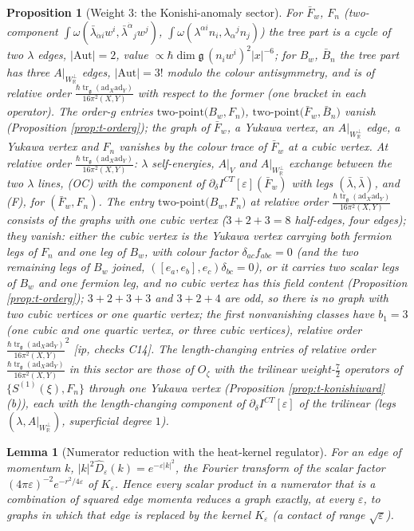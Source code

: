 \documentclass[11pt]{report}
\theoremstyle{plain}
\newtheorem{proposition}[theorem]{Proposition}
\newtheorem{lemma}[theorem]{Lemma}
\theoremstyle{definition}
\numberwithin{equation}{chapter}
\newcommand{\unit}{\tfrac{\hbar\operatorname{tr}_{\mathfrak g}(\mathrm{ad}_X\mathrm{ad}_Y)}{16\pi^2(X,Y)}}
\newcommand{\Wp}{W_{\mathbb R}^\perp}
\newcommand{\TP}[2]{\mathrm{two\mbox{-}point}\big(#1,#2\big)}
\begin{document}
\begin{proposition}[Weight $3$: the Konishi-anomaly sector]
\label{prop:t-census-w3}
For $\bar F_w$, $F_n$ (two-component $\int\omega(\bar\lambda_{\dot\alpha i}w^i,\bar\lambda^{\dot\alpha}{}_jw^j)$, $\int\omega(\lambda^{\alpha i}n_i,\lambda_\alpha{}^jn_j)$) the tree part is a cycle of two $\lambda$ edges, $|\mathrm{Aut}|=2$, value $\propto\hbar\dim\mathfrak g\,(n_iw^i)^2|x|^{-6}$; for $B_w$, $\bar B_n$ the tree part has three $A|_{\Wp}$ edges, $|\mathrm{Aut}|=3!$ modulo the colour antisymmetry, and is of relative order $\unit$ with respect to the former (one bracket in each operator). The order-$g$ entries $\TP{B_w}{F_n}$, $\TP{\bar F_w}{\bar B_n}$ vanish (Proposition \ref{prop:t-orderg}); the graph of $\bar F_w$, a Yukawa vertex, an $A|_{\Wp}$ edge, a Yukawa vertex and $F_n$ vanishes by the colour trace of $\bar F_w$ at a cubic vertex. At relative order $\unit$: $\lambda$ self-energies, $A|_V$ and $A|_{\Wp}$ exchange between the two $\lambda$ lines, (OC) with the component of $\partial_\delta I^{CT}[\varepsilon](\bar F_w)$ with legs $(\bar\lambda,\bar\lambda)$, and (F), for $(\bar F_w,F_n)$. The entry $\TP{B_w}{F_n}$ at relative order $\unit$ consists of the graphs with one cubic vertex ($3+2+3=8$ half-edges, four edges); they vanish: either the cubic vertex is the Yukawa vertex carrying both fermion legs of $F_n$ and one leg of $B_w$, with colour factor $\delta_{ac}f_{abc}=0$ (and the two remaining legs of $B_w$ joined, $([e_a,e_b],e_c)\delta_{bc}=0$), or it carries two scalar legs of $B_w$ and one fermion leg, and no cubic vertex has this field content (Proposition \ref{prop:t-orderg}); $3+2+3+3$ and $3+2+4$ are odd, so there is no graph with two cubic vertices or one quartic vertex; the first nonvanishing classes have $b_1=3$ (one cubic and one quartic vertex, or three cubic vertices), relative order $\unit^2$ [ip, checks C14]. The length-changing entries of relative order $\unit$ in this sector are those of $O_\zeta$ with the trilinear weight-$\tfrac72$ operators of $\{S^{(1)}(\xi),F_n\}$ through one Yukawa vertex (Proposition \ref{prop:t-konishiward} (b)), each with the length-changing component of $\partial_\delta I^{CT}[\varepsilon]$ of the trilinear (legs $(\lambda,A|_{\Wp})$, superficial degree $1$).
\end{proposition}

\begin{lemma}[Numerator reduction with the heat-kernel regulator]
\label{lem:t-reduce}
For an edge of momentum $k$, $|k|^2\hat D_\varepsilon(k)=e^{-\varepsilon|k|^2}$, the Fourier transform of the scalar factor $(4\pi\varepsilon)^{-2}e^{-r^2/4\varepsilon}$ of $K_\varepsilon$. Hence every scalar product in a numerator that is a combination of squared edge momenta reduces a graph exactly, at every $\varepsilon$, to graphs in which that edge is replaced by the kernel $K_\varepsilon$ (a contact of range $\sqrt\varepsilon$).
\end{lemma}
\end{document}
